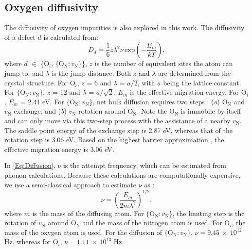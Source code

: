 \documentclass[preprint,12pt,sort&compress]{elsarticle}
\newcommand{\?}{\stackrel{?}{=}}
\begin{document}
\subsection{Oxygen diffusivity}
\label{Sec:Diff}

The diffusivity of oxygen impurities is also explored in this work. The diffusivity of a defect $d$ is calculated from:
\begin{equation}
D_d = \frac{1}{6} z \lambda^2 \nu \, \text{exp}\! \left( - \frac{E_m}{ k T } \right),
\label{Eq:Diffusion}
\end{equation}
\noindent where $d$ $\in$ \{O$_i$, $\{\text{O}_\text{N} \! : \! v_\text{N}\}$\}, $z$ is the number of equivalent sites the atom can jump to, and $\lambda$ is the jump distance. Both $z$ and $\lambda$ are determined from the crystal structure. For O$_i$, $z$ = 6 and $\lambda$ = $a/2$, with $a$ being the lattice constant. For $\{\text{O}_\text{N} \! : \! v_\text{N}\}$, $z$ = 12 and $\lambda$ = $a/\sqrt{2}$. $E_m$ is the effective migration energy. For O$_i$, $E_m$ = 2.41 eV. For $\{\text{O}_\text{N} \! : \! v_\text{N}\}$, net bulk diffusion requires two steps \cite{Kocevski2022II}: (\textit{a}) O$_\text{N}$ and $v_\text{N}$ exchange, and (\textit{b}) $v_\text{N}$ rotation around O$_\text{N}$. Note the $\text{O}_\text{N}$ is immobile by itself and can only move via this two-step process with the assistance of a nearby $v_\text{N}$. The saddle point energy of the exchange step is 2.87 eV, whereas that of the rotation step is 3.06 eV. Based on the highest barrier approximation \cite{Claisse2016}, the effective migration energy is 3.06 eV. %

In \cref{Eq:Diffusion}, $\nu$ is the attempt frequency, which can be estimated from phonon calculations. Because these calculations are computationally expensive, we use a semi-classical approach to estimate $\nu$ as \cite{Olander2017}:
\begin{equation}
\nu = \left( \frac{E_m}{2m\lambda^2} \right)^{1/2},
\label{Eq:nu}
\end{equation}
where $m$ is the mass of the diffusing atom. For $\{\text{O}_\text{N} \! : \! v_\text{N}\}$, the limiting step is the rotation of $v_\text{N}$  around O$_\text{N}$ and the mass of the nitrogen atom is used. For O$_i$, the mass of the oxygen atom is used. For the diffusion of $\{\text{O}_\text{N} \! : \! v_\text{N}\}$, $\nu = 9.45~\times~10^{12}$ Hz, whereas for $\text{O}_i$, $\nu = 1.11~\times~10^{13}$ Hz.
\end{document}
